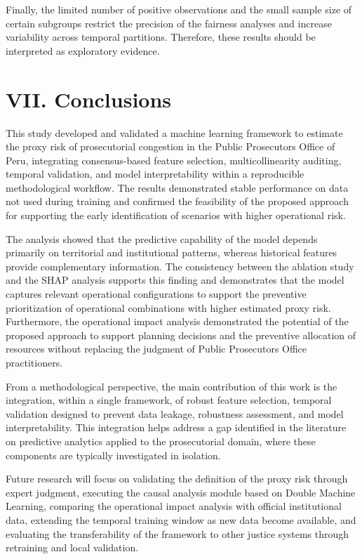 \documentclass[
  number]{elsarticle}
\begin{document}
Finally, the limited number of positive observations and the small
sample size of certain subgroups restrict the precision of the fairness
analyses and increase variability across temporal partitions. Therefore,
these results should be interpreted as exploratory evidence.

\section{VII. Conclusions}\label{vii.-conclusions}

This study developed and validated a machine learning framework to
estimate the proxy risk of prosecutorial congestion in the Public
Prosecutor\textquotesingle s Office of Peru, integrating consensus-based
feature selection, multicollinearity auditing, temporal validation, and
model interpretability within a reproducible methodological workflow.
The results demonstrated stable performance on data not used during
training and confirmed the feasibility of the proposed approach for
supporting the early identification of scenarios with higher operational
risk.

The analysis showed that the predictive capability of the model depends
primarily on territorial and institutional patterns, whereas historical
features provide complementary information. The consistency between the
ablation study and the SHAP analysis supports this finding and
demonstrates that the model captures relevant operational configurations
to support the preventive prioritization of operational combinations
with higher estimated proxy risk. Furthermore, the operational impact
analysis demonstrated the potential of the proposed approach to support
planning decisions and the preventive allocation of resources without
replacing the judgment of Public Prosecutor\textquotesingle s Office
practitioners.

From a methodological perspective, the main contribution of this work is
the integration, within a single framework, of robust feature selection,
temporal validation designed to prevent data leakage, robustness
assessment, and model interpretability. This integration helps address a
gap identified in the literature on predictive analytics applied to the
prosecutorial domain, where these components are typically investigated
in isolation.

Future research will focus on validating the definition of the proxy
risk through expert judgment, executing the causal analysis module based
on Double Machine Learning, comparing the operational impact analysis
with official institutional data, extending the temporal training window
as new data become available, and evaluating the transferability of the
framework to other justice systems through retraining and local
validation.



\end{document}
